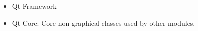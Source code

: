 
\begin{issues}
\issueDraft
\end{issues}

\begin{itemize}
\item Qt Framework
\item Qt Core: Core non-graphical classes used by other modules.
\end{itemize}

